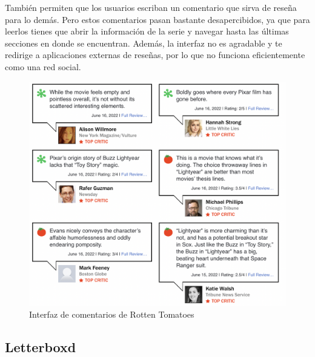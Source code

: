 También permiten que los usuarios escriban un comentario que sirva de reseña para lo demás. Pero estos comentarios
pasan bastante desapercibidos, ya que para leerlos tienes que abrir la información de la serie y navegar hasta las
últimas secciones en donde se encuentran. Además, la interfaz no es agradable y te redirige a aplicaciones externas de
reseñas, por lo que no funciona eficientemente como una red social.\\
\begin{figure}[H]
    \centering	
    \includegraphics[scale=0.25]{img/rotten-tomatoes-comments.png}
    \caption{ Interfaz de comentarios de Rotten Tomatoes }\label{fig:rotten_tomatoes}
\end{figure}

\subsection{Letterboxd}

